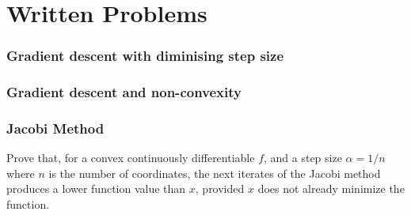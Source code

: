 \documentclass[11pt,a4paper]{article}
\begin{document}
\begin{titlepage}
    \maketitle
\end{titlepage}
\renewcommand{\contentsname}{Table of Contents}
\begin{center} 
    \tableofcontents 
    \listoffigures
\end{center}
\newpage
\newtheorem{remark}{Remark}
\part{Written Problems}
\setcounter{section}{0}
\renewcommand{\thesubsection}{(\alph{subsection})}
\section{Gradient descent with diminising step size}


\newpage
\section{Gradient descent and non-convexity}


\newpage
\section{Jacobi Method}
Prove that, for a convex continuously differentiable $f$, and a step size
$\alpha = 1/n$ where $n$ is the number of coordinates, the next iterates of
the Jacobi method produces a lower function value than $x$, provided $x$ does
not already minimize the function.
\end{document}

